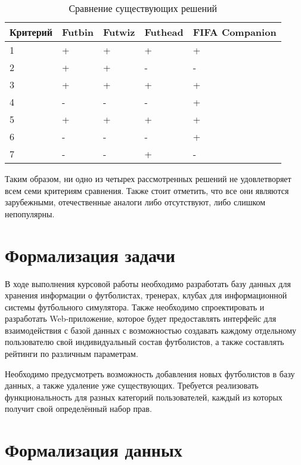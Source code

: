 \captionsetup{justification=raggedleft,singlelinecheck=off}
\begin{table}[H]
    \centering
	\caption{Сравнение существующих решений}
    \label{tbl:compare_realizations}
	\begin{tabular}{|l|l|l|l|l|}
        \hline
        \textbf{Критерий} & \textbf{Futbin} & \textbf{Futwiz} & \textbf{Futhead} & \textbf{FIFA Companion} \\ \hline

        1 & + & + & + & + \\ \hline
        2 & + & + & - & - \\ \hline
        3 & + & + & + & + \\ \hline
        4 & - & - & - & + \\ \hline
        5 & + & + & + & + \\ \hline
        6 & - & - & - & + \\ \hline
        7 & - & - & + & - \\ \hline

    \end{tabular}
\end{table}

Таким образом, ни одно из четырех рассмотренных решений не удовлетворяет всем семи критериям сравнения. Также стоит отметить, что все они являются зарубежными, отечественные аналоги либо отсутствуют, либо слишком непопулярны.

\section{Формализация задачи}

В ходе выполнения курсовой работы необходимо разработать базу данных для хранения информации о футболистах, тренерах, клубах для информационной системы футбольного симулятора. Также необходимо спроектировать и разработать Web-приложение, которое будет предоставлять интерфейс для взаимодействия с базой данных с возможностью создавать каждому отдельному пользователю свой индивидуальный состав футболистов, а также составлять рейтинги по различным параметрам. 

Необходимо предусмотреть возможность добавления новых футболистов в базу данных, а также удаление уже существующих. Требуется реализовать функциональность для разных категорий пользователей, каждый из которых получит свой определённый набор прав.

\clearpage

\section{Формализация данных}

